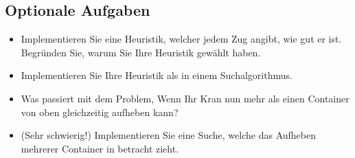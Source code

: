 \documentclass[a4paper,11pt,german,notitlepage]{report}
\begin{document}
\subsection*{Optionale Aufgaben}
\begin{itemize}
    \item Implementieren Sie eine Heuristik, welcher jedem Zug angibt, wie gut er ist. Begründen Sie, warum Sie Ihre Heuristik gewählt haben.
    \item Implementieren Sie Ihre Heuristik als in einem Suchalgorithmus.
    \item Was passiert mit dem Problem, Wenn Ihr Kran nun mehr als einen Container von oben gleichzeitig aufheben kann?
    \item (Sehr schwierig!) Implementieren Sie eine Suche, welche das Aufheben mehrerer Container in betracht zieht.
\end{itemize}
\end{document}

